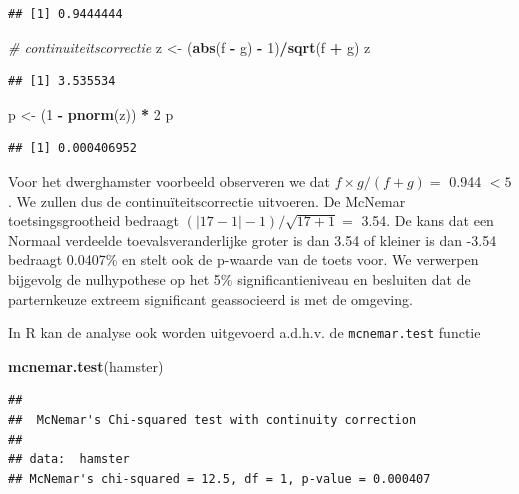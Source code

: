 \documentclass[
  12pt,dutch]{book}
\newenvironment{Shaded}{\begin{snugshade}}{\end{snugshade}}
\newcommand{\CommentTok}[1]{\textcolor[rgb]{0.56,0.35,0.01}{\textit{#1}}}
\newcommand{\DecValTok}[1]{\textcolor[rgb]{0.00,0.00,0.81}{#1}}
\newcommand{\FunctionTok}[1]{\textcolor[rgb]{0.13,0.29,0.53}{\textbf{#1}}}
\newcommand{\NormalTok}[1]{#1}
\newcommand{\OtherTok}[1]{\textcolor[rgb]{0.56,0.35,0.01}{#1}}
\newcommand{\SpecialCharTok}[1]{\textcolor[rgb]{0.81,0.36,0.00}{\textbf{#1}}}
\theoremstyle{definition}
\theoremstyle{definition}
\theoremstyle{definition}
\theoremstyle{definition}
\theoremstyle{remark}
\begin{document}
\begin{verbatim}
## [1] 0.9444444
\end{verbatim}

\begin{Shaded}
\begin{Highlighting}[]
\CommentTok{\# continuiteitscorrectie}
\NormalTok{z }\OtherTok{\textless{}{-}}\NormalTok{ (}\FunctionTok{abs}\NormalTok{(f }\SpecialCharTok{{-}}\NormalTok{ g) }\SpecialCharTok{{-}} \DecValTok{1}\NormalTok{)}\SpecialCharTok{/}\FunctionTok{sqrt}\NormalTok{(f }\SpecialCharTok{+}\NormalTok{ g)}
\NormalTok{z}
\end{Highlighting}
\end{Shaded}

\begin{verbatim}
## [1] 3.535534
\end{verbatim}

\begin{Shaded}
\begin{Highlighting}[]
\NormalTok{p }\OtherTok{\textless{}{-}}\NormalTok{ (}\DecValTok{1} \SpecialCharTok{{-}} \FunctionTok{pnorm}\NormalTok{(z)) }\SpecialCharTok{*} \DecValTok{2}
\NormalTok{p}
\end{Highlighting}
\end{Shaded}

\begin{verbatim}
## [1] 0.000406952
\end{verbatim}

Voor het dwerghamster voorbeeld observeren we dat
\(f\times g/(f+g)=\) 0.944 \(<5\).
We zullen dus de continuïteitscorrectie uitvoeren.
De McNemar toetsingsgrootheid bedraagt
\((\vert 17-1 \vert -1)/\sqrt{17+1}=\) 3.54.
De kans dat een Normaal verdeelde toevalsveranderlijke groter is
dan 3.54 of kleiner is dan -3.54 bedraagt 0.0407\% en stelt ook de p-waarde van
de toets voor. We verwerpen bijgevolg de nulhypothese op het 5\% significantieniveau en
besluiten dat de parternkeuze extreem significant geassocieerd is met de omgeving.

In R kan de analyse ook worden uitgevoerd a.d.h.v. de \texttt{mcnemar.test} functie

\begin{Shaded}
\begin{Highlighting}[]
\FunctionTok{mcnemar.test}\NormalTok{(hamster)}
\end{Highlighting}
\end{Shaded}

\begin{verbatim}
## 
##  McNemar's Chi-squared test with continuity correction
## 
## data:  hamster
## McNemar's chi-squared = 12.5, df = 1, p-value = 0.000407
\end{verbatim}
\end{document}
